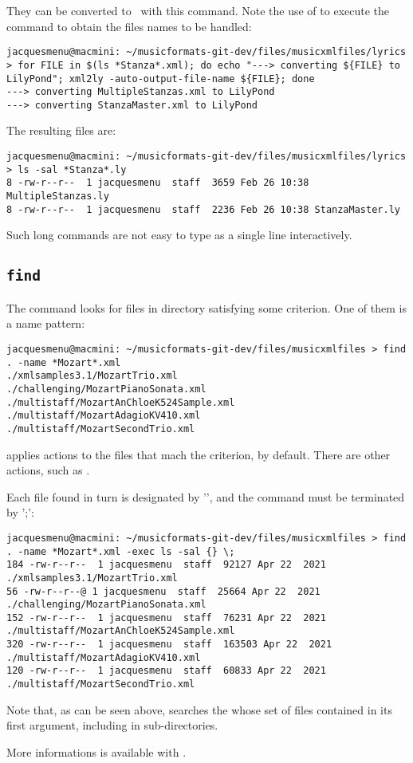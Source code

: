 They can be converted to \lily\ with this  command. Note the use of  to execute the  command to obtain the files names to be handled:
\begin{lstlisting}[language=Terminal]
jacquesmenu@macmini: ~/musicformats-git-dev/files/musicxmlfiles/lyrics > for FILE in $(ls *Stanza*.xml); do echo "---> converting ${FILE} to LilyPond"; xml2ly -auto-output-file-name ${FILE}; done
---> converting MultipleStanzas.xml to LilyPond
---> converting StanzaMaster.xml to LilyPond
\end{lstlisting}

The resulting files are:
\begin{lstlisting}[language=Terminal]
jacquesmenu@macmini: ~/musicformats-git-dev/files/musicxmlfiles/lyrics > ls -sal *Stanza*.ly
8 -rw-r--r--  1 jacquesmenu  staff  3659 Feb 26 10:38 MultipleStanzas.ly
8 -rw-r--r--  1 jacquesmenu  staff  2236 Feb 26 10:38 StanzaMaster.ly
\end{lstlisting}

Such long  commands are not easy to type as a single line interactively.


\subsection{{\tt find}}

The  command looks for files in directory satisfying some criterion. One of them is a name pattern:
\begin{lstlisting}[language=Terminal]
jacquesmenu@macmini: ~/musicformats-git-dev/files/musicxmlfiles > find . -name *Mozart*.xml
./xmlsamples3.1/MozartTrio.xml
./challenging/MozartPianoSonata.xml
./multistaff/MozartAnChloeK524Sample.xml
./multistaff/MozartAdagioKV410.xml
./multistaff/MozartSecondTrio.xml
\end{lstlisting}

 applies actions to the files that mach the criterion,  by default. There are other actions, such as . 

Each file found in turn is designated by '\code{\{\}}', and the command must be terminated by '\code{\textbackslash};':
\begin{lstlisting}[language=Terminal]
jacquesmenu@macmini: ~/musicformats-git-dev/files/musicxmlfiles > find . -name *Mozart*.xml -exec ls -sal {} \;
184 -rw-r--r--  1 jacquesmenu  staff  92127 Apr 22  2021 ./xmlsamples3.1/MozartTrio.xml
56 -rw-r--r--@ 1 jacquesmenu  staff  25664 Apr 22  2021 ./challenging/MozartPianoSonata.xml
152 -rw-r--r--  1 jacquesmenu  staff  76231 Apr 22  2021 ./multistaff/MozartAnChloeK524Sample.xml
320 -rw-r--r--  1 jacquesmenu  staff  163503 Apr 22  2021 ./multistaff/MozartAdagioKV410.xml
120 -rw-r--r--  1 jacquesmenu  staff  60833 Apr 22  2021 ./multistaff/MozartSecondTrio.xml
\end{lstlisting}

Note that, as can be seen above,  searches the whose set of files contained in its first argument, including in sub-directories.

More informations is available with .
